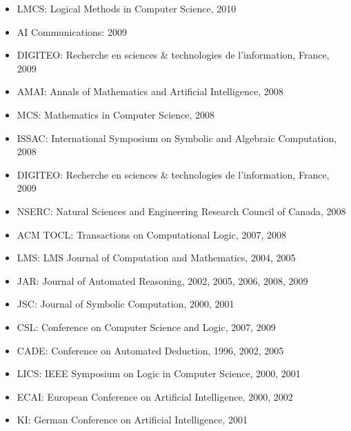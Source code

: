 \documentclass{letter}
\begin{document}
\begin{itemize}
  \item LMCS: Logical Methods in Computer Science, 2010
  
  \item AI Communications: 2009
  
  \item DIGITEO: Recherche en sciences \& technologies de l'information,
  France, 2009
  
  \item AMAI: Annals of Mathematics and Artificial Intelligence, 2008
  
  \item MCS: Mathematics in Computer Science, 2008
  
  \item ISSAC: International Symposium on Symbolic and Algebraic Computation,
  2008
  
  \item DIGITEO: Recherche en sciences \& technologies de l'information,
  France, 2009
  
  \item NSERC: Natural Sciences and Engineering Research Council of Canada,
  2008
  
  \item ACM TOCL: Transactions on Computational Logic, 2007, 2008
  
  \item LMS: LMS Journal of Computation and Mathematics, 2004, 2005
  
  \item {\small JAR: Journal of Automated Reasoning, 2002, 2005}, 2006, 2008,
  2009
  
  \item JSC: {\small Journal of Symbolic Computation}, 2000, 2001
  
  \item CSL: Conference on Computer Science and Logic, 2007, 2009
  
  \item CADE: {\small Conference on Automated Deduction}, 1996, 2002, 2005
  
  \item LICS: {\small IEEE Symposium on Logic in Computer Science}, 2000, 2001
  
  \item ECAI: {\small {\color{black} European Conference on Artificial
  Intelligence}}, 2000, 2002
  
  \item {\small KI: German Conference on Artificial Intelligence}, 2001
  

\end{itemize}
\end{document}
